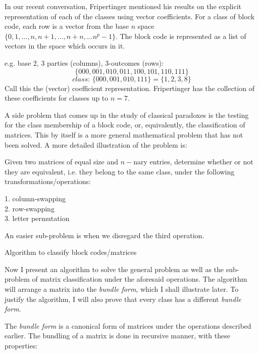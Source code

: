 \documentclass[12pt]{article}  %
\begin{document}
In our recent conversation, Fripertinger mentioned his results on the explicit representation of each of the classes using vector coefficients. For a class of block code, each row is a vector from the base $n$ space $\{0,1,\dots,n, n+1, \dots, n+n, \dots n^p-1\}$. The block code is represented as a list of vectors in the space which occurs in it.


e.g. base 2, 3 parties (columns), 3-outcomes (rows): $$\{000,001,010,011,100,101,110,111\}$$
$$\textit{class: } \{000, 001, 010, 111 \} = \{1, 2, 3, 8\} $$
Call this the (vector) coefficient representation. Fripertinger has the collection of these coefficients for classes up to $n=7$.


A side problem that comes up in the study of classical paradoxes is the testing for the class membership of a block code, or, equivalently, the classification of matrices. This by itself is a more general mathematical problem that has not been solved. A more detailed illustration of the problem is:


Given two matrices of equal size and $n-$nary entries, determine whether or not they are equivalent, i.e. they belong to the same class, under the following transformations/operations:

1. column-swapping\\
2. row-swapping\\
3. letter permutation

An easier sub-problem is when we disregard the third operation.\\




{\large \centerline{Algorithm to classify block codes/matrices}}

Now I present an algorithm to solve the general problem as well as the sub-problem of matrix classification under the aforesaid operations. The algorithm will arrange a matrix into the \textit{bundle form}, which I shall illustrate later. To justify the algorithm, I will also prove that every class has a different \textit{bundle form}.


The \textit{bundle form} is a canonical form of matrices under the operations described earlier. The bundling of a matrix is done in recursive manner, with these properties:
\end{document}
